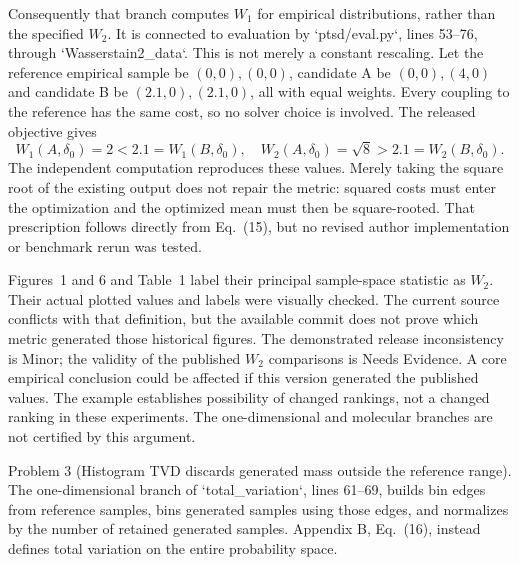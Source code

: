 \documentclass[10pt]{article}
\begin{document}
Consequently that branch computes \(W_1\) for empirical distributions, rather than the specified \(W_2\). It is connected to evaluation by `ptsd/eval.py`, lines 53–76, through `Wasserstain2\_data`. This is not merely a constant rescaling. Let the reference empirical sample be \((0,0),(0,0)\), candidate A be \((0,0),(4,0)\) and candidate B be \((2.1,0),(2.1,0)\), all with equal weights. Every coupling to the reference has the same cost, so no solver choice is involved. The released objective gives \[W_1(A,\delta_0)=2<2.1=W_1(B,\delta_0),
\quad W_2(A,\delta_0)=\sqrt8>2.1=W_2(B,\delta_0).\] The independent computation reproduces these values. Merely taking the square root of the existing output does not repair the metric: squared costs must enter the optimization and the optimized mean must then be square-rooted. That prescription follows directly from Eq. (15), but no revised author implementation or benchmark rerun was tested.\par
Figures 1 and 6 and Table 1 label their principal sample-space statistic as \(W_2\). Their actual plotted values and labels were visually checked. The current source conflicts with that definition, but the available commit does not prove which metric generated those historical figures. The demonstrated release inconsistency is Minor; the validity of the published \(W_2\) comparisons is Needs Evidence. A core empirical conclusion could be affected if this version generated the published values. The example establishes possibility of changed rankings, not a changed ranking in these experiments. The one-dimensional and molecular branches are not certified by this argument.\par
Problem 3 (Histogram TVD discards generated mass outside the reference range).  The one-dimensional branch of `total\_variation`, lines 61–69, builds bin edges from reference samples, bins generated samples using those edges, and normalizes by the number of retained generated samples. Appendix B, Eq. (16), instead defines total variation on the entire probability space.\par
\end{document}
